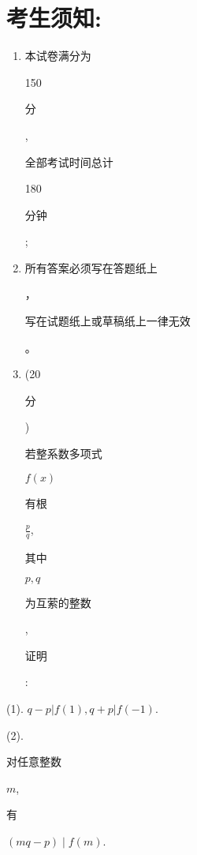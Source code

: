 \documentclass[10pt]{article}
\begin{document}
\section{考生须知:}
\begin{enumerate}
  \item \begin{CJK}{UTF8}{mj}本试卷满分为\end{CJK} 150 \begin{CJK}{UTF8}{mj}分\end{CJK}, \begin{CJK}{UTF8}{mj}全部考试时间总计\end{CJK} 180 \begin{CJK}{UTF8}{mj}分钟\end{CJK};

  \item \begin{CJK}{UTF8}{mj}所有答案必须写在答题纸上\end{CJK}，\begin{CJK}{UTF8}{mj}写在试题纸上或草稿纸上一律无效\end{CJK}。

  \item (20 \begin{CJK}{UTF8}{mj}分\end{CJK}) \begin{CJK}{UTF8}{mj}若整系数多项式\end{CJK} $f(x)$ \begin{CJK}{UTF8}{mj}有根\end{CJK} $\frac{p}{q}$, \begin{CJK}{UTF8}{mj}其中\end{CJK} $p, q$ \begin{CJK}{UTF8}{mj}为互萦的整数\end{CJK}, \begin{CJK}{UTF8}{mj}证明\end{CJK}:

\end{enumerate}
(1). $q-p|f(1), q+p| f(-1)$.

(2). \begin{CJK}{UTF8}{mj}对任意整数\end{CJK} $m$, \begin{CJK}{UTF8}{mj}有\end{CJK} $(m q-p) \mid f(m)$.
\end{document}
